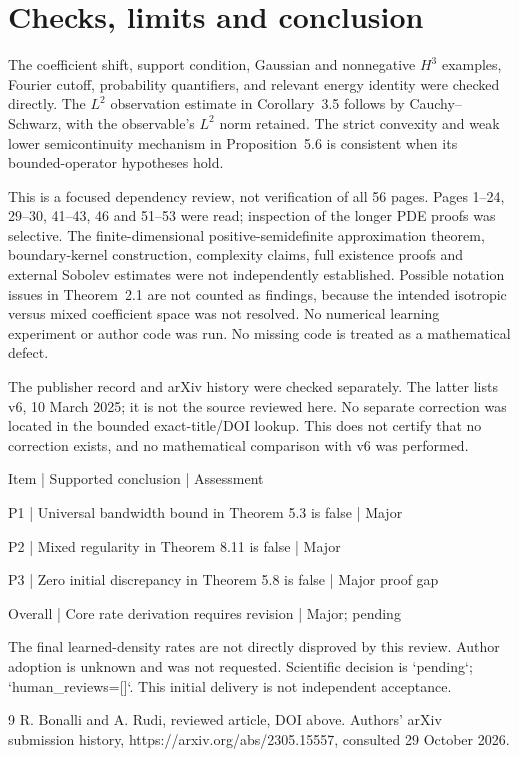 \documentclass[10pt]{article}
\begin{document}
\section*{Checks, limits and conclusion}
The coefficient shift, support condition, Gaussian and nonnegative \(H^3\) examples, Fourier cutoff, probability quantifiers, and relevant energy identity were checked directly. The \(L^2\) observation estimate in Corollary 3.5 follows by Cauchy–Schwarz, with the observable’s \(L^2\) norm retained. The strict convexity and weak lower semicontinuity mechanism in Proposition 5.6 is consistent when its bounded-operator hypotheses hold.\par
This is a focused dependency review, not verification of all 56 pages. Pages 1–24, 29–30, 41–43, 46 and 51–53 were read; inspection of the longer PDE proofs was selective. The finite-dimensional positive-semidefinite approximation theorem, boundary-kernel construction, complexity claims, full existence proofs and external Sobolev estimates were not independently established. Possible notation issues in Theorem 2.1 are not counted as findings, because the intended isotropic versus mixed coefficient space was not resolved. No numerical learning experiment or author code was run. No missing code is treated as a mathematical defect.\par
The publisher record and arXiv history were checked separately. The latter lists v6, 10 March 2025; it is not the source reviewed here. No separate correction was located in the bounded exact-title/DOI lookup. This does not certify that no correction exists, and no mathematical comparison with v6 was performed.\par
Item | Supported conclusion | Assessment\par
P1 | Universal bandwidth bound in Theorem 5.3 is false | Major\par
P2 | Mixed regularity in Theorem 8.11 is false | Major\par
P3 | Zero initial discrepancy in Theorem 5.8 is false | Major proof gap\par
Overall | Core rate derivation requires revision | Major; pending\par
The final learned-density rates are not directly disproved by this review. Author adoption is unknown and was not requested. Scientific decision is `pending`; `human\_reviews=[]`. This initial delivery is not independent acceptance.\par
9 R. Bonalli and A. Rudi, reviewed article, DOI above. Authors’ arXiv submission history, https://arxiv.org/abs/2305.15557, consulted 29 October 2026.\par
\end{document}
